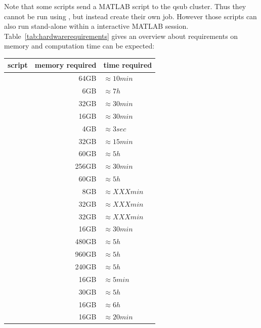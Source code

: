 \documentclass[12pt,a4paper]{scrartcl}
\begin{document}
\noindent Note that some scripts send a MATLAB script to the qsub cluster. Thus they cannot be run using \texttt{}, but instead create their own job. However those scripts can also run stand-alone within a interactive MATLAB session.\\

\noindent Table~\ref{tab:hardwarerequirements} gives an overview about requirements on memory and computation time can be expected:

\begin{table}[h]
\centering
\begin{tabular}{l | r | l}
\toprule
script & memory required & time required\\\hline
  \nameref{sh:combsplt} & 64GB & $\approx 10min$ \\\hline
  \nameref{sh:analyzePRF} & 6GB & $\approx 7h$ \\\hline
  \nameref{sh:applydistcorr} & 32GB & $\approx 30min$ \\\hline
  \nameref{sh:coreg} & 16GB & $\approx 30min$ \\\hline
  \nameref{sh:corravg} & 4GB & $\approx 3sec$ \\\hline
  \nameref{sh:distcorr} & 32GB & $\approx 15min$ \\\hline
  \nameref{sh:beamf} & 60GB & $\approx 5h$ \\\hline
  \nameref{sh:selchan} & 256GB & $\approx 30min$ \\\hline
  \nameref{sh:freqVirt} & 60GB & $\approx 5h$ \\\hline
  \nameref{sh:prepFS4EEG} & 8GB & $\approx XXXmin$ \\\hline
  \nameref{sh:prepHM} & 32GB & $\approx XXXmin$ \\\hline
  \nameref{sh:prepSM} & 32GB & $\approx XXXmin$ \\\hline
  \nameref{sh:EEGpreproc} & 16GB & $\approx 30min$ \\\hline
  \nameref{sh:splitbeamf} & 480GB & $\approx 5h$ \\\hline
  \nameref{sh:splitfreqVirt} & 960GB & $\approx 5h$ \\\hline
  \nameref{sh:splitvirtch} & 240GB & $\approx 5h$ \\\hline
  \nameref{sh:timelock} & 16GB & $\approx 5min$ \\\hline
  \nameref{sh:virtch} & 30GB & $\approx 5h$ \\\hline
  \nameref{sh:fsrecon} & 16GB & $\approx 6h$ \\\hline
  \nameref{sh:getLyr} & 16GB & $\approx 20min$ \\\hline

\end{tabular}
\end{table}
\end{document}
